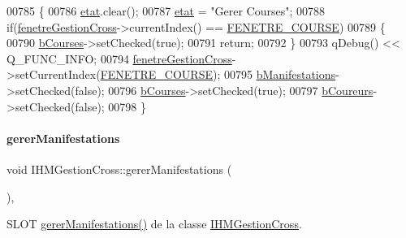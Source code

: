 \begin{DoxyCode}
00785 \{
00786     \hyperlink{class_i_h_m_gestion_cross_a5da4390d71dbd5d05cff339f93c7c85a}{etat}.clear();
00787     \hyperlink{class_i_h_m_gestion_cross_a5da4390d71dbd5d05cff339f93c7c85a}{etat} = \textcolor{stringliteral}{"Gerer Courses"};
00788     \textcolor{keywordflow}{if}(\hyperlink{class_i_h_m_gestion_cross_a2ae4807c25f35813507ff0a2abb2ffb3}{fenetreGestionCross}->currentIndex() == \hyperlink{ihmgestioncross_8h_a33016bbf4e13bffdd4306616fe9d6a0f}{FENETRE\_COURSE})
00789     \{
00790         \hyperlink{class_i_h_m_gestion_cross_a0df377aec07ada51a115cc458854c966}{bCourses}->setChecked(\textcolor{keyword}{true});
00791         \textcolor{keywordflow}{return};
00792     \}
00793     qDebug() << Q\_FUNC\_INFO;
00794     \hyperlink{class_i_h_m_gestion_cross_a2ae4807c25f35813507ff0a2abb2ffb3}{fenetreGestionCross}->setCurrentIndex(\hyperlink{ihmgestioncross_8h_a33016bbf4e13bffdd4306616fe9d6a0f}{FENETRE\_COURSE});
00795     \hyperlink{class_i_h_m_gestion_cross_a540b4525e546b6d61988245ae53768ce}{bManifestations}->setChecked(\textcolor{keyword}{false});
00796     \hyperlink{class_i_h_m_gestion_cross_a0df377aec07ada51a115cc458854c966}{bCourses}->setChecked(\textcolor{keyword}{true});
00797     \hyperlink{class_i_h_m_gestion_cross_ac2819198bae00b7e0f23e8bc491b4cbb}{bCoureurs}->setChecked(\textcolor{keyword}{false});
00798 \}
\end{DoxyCode}
\mbox{\label{class_i_h_m_gestion_cross_a406efb83dac8a8ac5d04e9b8cbeaf316}} 
\paragraph{\texorpdfstring{gerer\+Manifestations}{gererManifestations}}
{\footnotesize\ttfamily void I\+H\+M\+Gestion\+Cross\+::gerer\+Manifestations (\begin{DoxyParamCaption}{ }\end{DoxyParamCaption})\hspace{0.3cm}{\ttfamily [private]}, {\ttfamily [slot]}}



S\+L\+OT \hyperlink{class_i_h_m_gestion_cross_a406efb83dac8a8ac5d04e9b8cbeaf316}{gerer\+Manifestations()} de la classe \hyperlink{class_i_h_m_gestion_cross}{I\+H\+M\+Gestion\+Cross}. 

